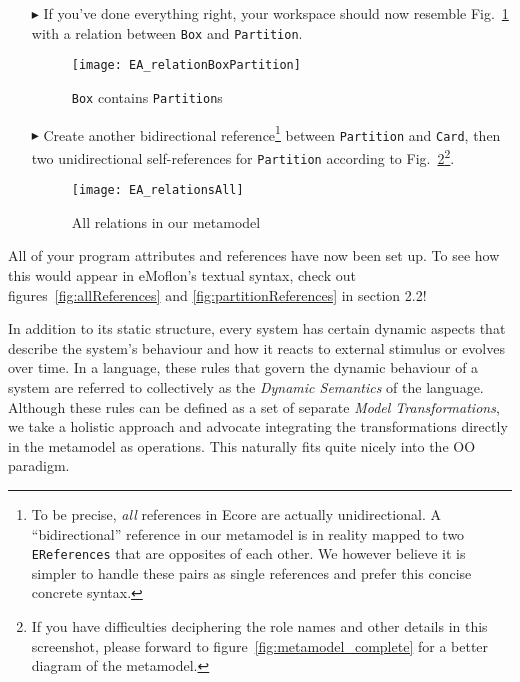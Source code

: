 \begin{enumerate}

\item[$\blacktriangleright$] If you've done everything right, your workspace should now resemble Fig.~\ref{fig:ereference_completed} with a relation between
\texttt{Box} and \texttt{Partition}.

\begin{figure}[htbp]
	\centering
  \texttt{[image: EA\_relationBoxPartition]}
	\caption{\texttt{Box} contains \texttt{Partition}s}
	\label{fig:ereference_completed}
\end{figure}
\FloatBarrier


\item[$\blacktriangleright$] Create another bidirectional reference\footnote{To be precise, \emph{all} references in Ecore are actually unidirectional.
A ``bidirectional'' reference in our metamodel is in reality mapped to two \texttt{EReferences} that are opposites of each other.
We however believe it is simpler to handle these pairs as single references and prefer this concise concrete syntax.} between \texttt{Partition} and
\texttt{Card}, then two unidirectional self-references for \texttt{Partition} according to Fig.~\ref{fig:ereferences_all}\footnote{If you have difficulties
deciphering the role names and other details in this screenshot, please forward to figure~\ref{fig:metamodel_complete} for a better diagram of the metamodel.}.

\begin{figure}[htbp]
	\centering
  \texttt{[image: EA\_relationsAll]}
	\caption{All relations in our metamodel}
	\label{fig:ereferences_all}
\end{figure}
\end{enumerate}
\FloatBarrier

All of your program attributes and references have now been set up. To see how this would appear in eMoflon's textual syntax, check out
figures~\ref{fig:allReferences} and \ref{fig:partitionReferences} in \hypertarget{sec:static tex}{section 2.2}!

\vfill
\pagebreak

In addition to its static structure, every system has certain dynamic aspects that describe the system's behaviour and how it reacts to external stimulus or
evolves over time.  In a language, these rules that govern the dynamic behaviour of a system are referred to collectively as
the \emph{Dynamic Semantics} of the language.
Although these rules can be defined as a set of separate \emph{Model Transformations}, we take a holistic approach and advocate integrating the transformations
directly in the metamodel as operations. This naturally fits quite nicely into the OO paradigm.

